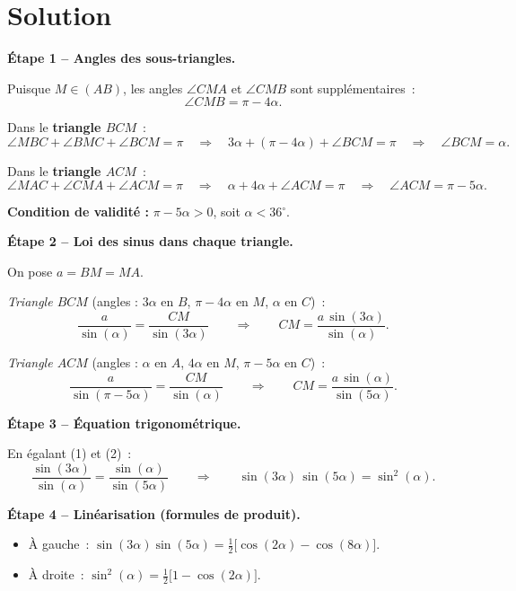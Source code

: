 \documentclass[a4paper,12pt]{article}
\newcommand{\degmark}{{}^{\circ}}
\begin{document}
\section*{Solution}

\textbf{\'Etape 1 -- Angles des sous-triangles.}

Puisque $M \in (AB)$, les angles $\angle CMA$ et $\angle CMB$ sont suppl\'ementaires~:
\[
  \angle CMB = \pi - 4\alpha.
\]

Dans le \textbf{triangle $BCM$}~:
\[
  \angle MBC + \angle BMC + \angle BCM = \pi
  \quad\Longrightarrow\quad
  3\alpha + (\pi - 4\alpha) + \angle BCM = \pi
  \quad\Longrightarrow\quad
  \angle BCM = \alpha.
\]

Dans le \textbf{triangle $ACM$}~:
\[
  \angle MAC + \angle CMA + \angle ACM = \pi
  \quad\Longrightarrow\quad
  \alpha + 4\alpha + \angle ACM = \pi
  \quad\Longrightarrow\quad
  \angle ACM = \pi - 5\alpha.
\]

\textbf{Condition de validit\'e :} $\pi - 5\alpha > 0$, soit $\alpha < 36\degmark$.

\bigskip

\textbf{\'Etape 2 -- Loi des sinus dans chaque triangle.}

On pose $a = BM = MA$.

\medskip
\emph{Triangle $BCM$} (angles : $3\alpha$ en $B$,\; $\pi - 4\alpha$ en $M$,\; $\alpha$ en $C$)~:
\[
  \frac{a}{\sin(\alpha)} = \frac{CM}{\sin(3\alpha)}
  \qquad\Longrightarrow\qquad
  CM = \frac{a\,\sin(3\alpha)}{\sin(\alpha)}.  \tag{1}
\]

\emph{Triangle $ACM$} (angles : $\alpha$ en $A$,\; $4\alpha$ en $M$,\; $\pi - 5\alpha$ en $C$)~:
\[
  \frac{a}{\sin(\pi - 5\alpha)} = \frac{CM}{\sin(\alpha)}
  \qquad\Longrightarrow\qquad
  CM = \frac{a\,\sin(\alpha)}{\sin(5\alpha)}.  \tag{2}
\]

\bigskip

\textbf{\'Etape 3 -- \'Equation trigonom\'etrique.}

En \'egalant (1) et (2)~:
\[
  \frac{\sin(3\alpha)}{\sin(\alpha)} = \frac{\sin(\alpha)}{\sin(5\alpha)}
  \qquad\Longrightarrow\qquad
  \boxed{\sin(3\alpha)\,\sin(5\alpha) = \sin^2(\alpha)}.
\]

\bigskip

\textbf{\'Etape 4 -- Lin\'earisation (formules de produit).}

\begin{itemize}
  \item \`A gauche~: $\displaystyle \sin(3\alpha)\sin(5\alpha)
    = \tfrac{1}{2}\bigl[\cos(2\alpha) - \cos(8\alpha)\bigr]$.
  \item \`A droite~: $\displaystyle \sin^2(\alpha)
    = \tfrac{1}{2}\bigl[1 - \cos(2\alpha)\bigr]$.
\end{itemize}
\end{document}
